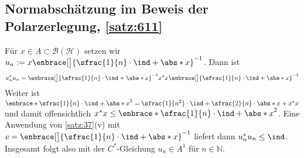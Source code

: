 \subsection{Normabschätzung im Beweis der Polarzerlegung, \ref{satz:611}} %
\label{sub:normabschatzung_im_beweis_der_polarzerlegung}
Für $x \in A \subset \mathcal{B}(\mathcal{H})$ setzen wir $u_n := x\enbrace[\big]{\sfrac{1}{n}\cdot \ind+ \abs*{x}}^{-1}$.
Dann ist
\[
	u_n^* u_n = \enbrace[\big]{\sfrac{1}{n}\cdot \ind + \abs*{x}}^{-1} x^* x \enbrace[\big]{\sfrac{1}{n}\cdot \ind + \abs*{x}}^{-1}
\]
Weiter ist $\enbrace*{\sfrac{1}{n}\cdot \ind + \abs*{x}}^2 = \sfrac{1}{n^2} \cdot \ind + \sfrac{2}{n} \cdot \abs*{x} + x^*x$ und damit offensichtlich $x^*x \le \enbrace*{\sfrac{1}{n}\cdot \ind + \abs*{x}}^2$.
Eine Anwendung von \autoref{satz:37}(v) mit $c=\enbrace[\big]{\sfrac{1}{n}\cdot \ind+ \abs*{x}}^{-1}$ liefert dann $u^*_n u_n \le \ind$.
Insgesamt folgt also mit der $C^*$-Gleichung $u_n \in A^1$ für $n \in \mathbb{N}$.

